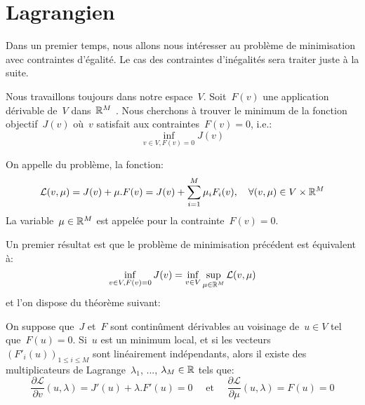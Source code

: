 \medskip
\section{Lagrangien}

Dans un premier temps, nous allons nous intéresser au problème de minimisation avec contraintes d'égalité. Le cas des contraintes d'inégalités sera traiter juste à la suite.

\medskip
\begin{definition}
Nous travaillons toujours dans notre espace~$V$.
Soit~$F(v)$ une application dérivable de~$V$ dans~$\mathbb R^M$ .
Nous cherchons à trouver le minimum de la fonction objectif~$J(v)$ où~$v$ satisfait aux contraintes~$F(v)=0$, i.e.:
\begin{equation}\label{Eq-LagEq}
\inf_{v\in V, F(v)=0} J(v)
\end{equation}

On appelle  du problème, la fonction:
\begin{equation}
\mathcal{L}(v,\mu) = J(v)+\mu.F(v) = J(v) + \displaystyle\sum_{i=1}^M \mu_iF_i(v), 
\quad \forall (v,\mu)\in V\times\mathbb R^M
\end{equation}
La variable~$\mu\in\mathbb R^M$ est appelée  pour la contrainte~$F(v)=0$.
\end{definition}

Un premier résultat est que le problème de minimisation précédent est équivalent à:
\begin{equation}
\inf_{v\in V, F(v)=0} J(v) = \inf_{v\in V} \sup_{\mu\in\mathbb R^M} \mathcal{L}(v,\mu)
\end{equation}
et l'on dispose du théorème suivant:
\begin{theoreme}
On suppose que~$J$ et~$F$ sont continûment dérivables au voisinage de~$u\in V$ tel que~$F(u)=0$. Si~$u$ est un minimum local, et si les vecteurs~$(F'_i(u))_{1\le i\le M}$ sont linéairement indépendants, alors il existe des multiplicateurs de Lagrange~$\lambda_1$, ..., $\lambda_M\in\mathbb R$ tels que:
\begin{equation}
\dfrac{\partial\mathcal{L}}{\partial v}(u,\lambda) = J'(u)+\lambda.F'(u)=0
\quad \text{ et }\quad
\dfrac{\partial\mathcal{L}}{\partial \mu}(u,\lambda) = F(u)=0
\end{equation}
\end{theoreme}

